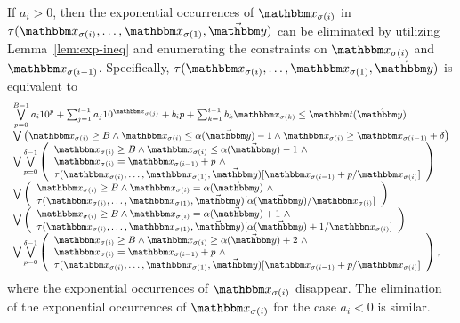 If $a_i > 0$, then the exponential occurrences of $\ivarx_{\sigma(i)}$ in $\tau(\ivarx_{\sigma(i)}, \ldots, \ivarx_{\sigma(1)}, \vec{\ivary})$ can be eliminated by utilizing  Lemma~\ref{lem:exp-ineq} and enumerating the constraints on $\ivarx_{\sigma(i)}$ and $\ivarx_{\sigma(i-1)}$. Specifically, 
$\tau(\ivarx_{\sigma(i)}, \ldots, \ivarx_{\sigma(1)}, \vec{\ivary})$ is equivalent to 
\[
\small
\begin{array}{l}
\bigvee \limits_{p=0}^{B-1} a_i 10^{p}+\sum_{j=1}^{i-1} a_j 10^{\ivarx_{\sigma(j)}} + b_i p + \sum_{k=1}^{i-1}b_k \ivarx_{\sigma(k)} \le \iterm(\vec{\ivary}) \\
\bigvee \big(\ivarx_{\sigma(i)} \ge B \wedge \ivarx_{\sigma(i)} \le \alpha(\vec{\ivary})  -1  \wedge \ivarx_{\sigma(i)} \ge \ivarx_{\sigma(i-1)} +\delta \big)\\
%
\bigvee \bigvee \limits_{p=0}^{\delta-1} 
\left(
\begin{array}{l}
\ivarx_{\sigma(i)} \ge B \wedge \ivarx_{\sigma(i)} \le \alpha(\vec{\ivary})  -1 \ \wedge \\
 \ivarx_{\sigma(i)} = \ivarx_{\sigma(i-1)} +p\ \wedge\\
 \tau(\ivarx_{\sigma(i)}, \ldots, \ivarx_{\sigma(1)}, \vec{\ivary})[\ivarx_{\sigma(i-1)} + p /\ivarx_{\sigma(i)}] 
\end{array}
\right)\\
\bigvee 
\left(
\begin{array}{l}
\ivarx_{\sigma(i)} \ge B \wedge \ivarx_{\sigma(i)} = \alpha(\vec{\ivary})\ \wedge \\
\tau(\ivarx_{\sigma(i)}, \ldots, \ivarx_{\sigma(1)}, \vec{\ivary})[\alpha(\vec{\ivary})/\ivarx_{\sigma(i)}]
\end{array}
\right)  \\
\bigvee 
\left(
\begin{array}{l}
\ivarx_{\sigma(i)} \ge B \wedge \ivarx_{\sigma(i)} = \alpha(\vec{\ivary})+1\ \wedge \\
\tau(\ivarx_{\sigma(i)}, \ldots, \ivarx_{\sigma(1)}, \vec{\ivary})[\alpha(\vec{\ivary})+1/\ivarx_{\sigma(i)}]
\end{array}
\right)  \\
\bigvee \bigvee \limits_{p=0}^{\delta-1} 
\left(
\begin{array}{l}
\ivarx_{\sigma(i)} \ge B \wedge \ivarx_{\sigma(i)} \ge \alpha(\vec{\ivary})+2\ \wedge\\
 \ivarx_{\sigma(i)} = \ivarx_{\sigma(i-1)} +p\ \wedge \\
 \tau(\ivarx_{\sigma(i)}, \ldots, \ivarx_{\sigma(1)}, \vec{\ivary})[\ivarx_{\sigma(i-1)}+ p /\ivarx_{\sigma(i)}]
\end{array}
\right),
\end{array}
\]
where the exponential occurrences of $\ivarx_{\sigma(i)}$ disappear.  
%
The elimination of the exponential occurrences of $\ivarx_{\sigma(i)}$ for the case $a_i < 0$ is similar. 


